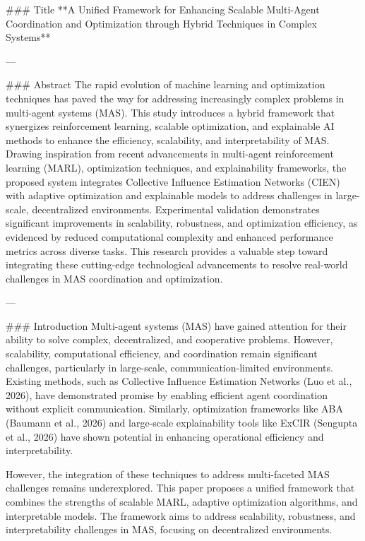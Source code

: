 ### Title  
**A Unified Framework for Enhancing Scalable Multi-Agent Coordination and Optimization through Hybrid Techniques in Complex Systems**

---

### Abstract  
The rapid evolution of machine learning and optimization techniques has paved the way for addressing increasingly complex problems in multi-agent systems (MAS). This study introduces a hybrid framework that synergizes reinforcement learning, scalable optimization, and explainable AI methods to enhance the efficiency, scalability, and interpretability of MAS. Drawing inspiration from recent advancements in multi-agent reinforcement learning (MARL), optimization techniques, and explainability frameworks, the proposed system integrates Collective Influence Estimation Networks (CIEN) with adaptive optimization and explainable models to address challenges in large-scale, decentralized environments. Experimental validation demonstrates significant improvements in scalability, robustness, and optimization efficiency, as evidenced by reduced computational complexity and enhanced performance metrics across diverse tasks. This research provides a valuable step toward integrating these cutting-edge technological advancements to resolve real-world challenges in MAS coordination and optimization.

---

### Introduction  
Multi-agent systems (MAS) have gained attention for their ability to solve complex, decentralized, and cooperative problems. However, scalability, computational efficiency, and coordination remain significant challenges, particularly in large-scale, communication-limited environments. Existing methods, such as Collective Influence Estimation Networks (Luo et al., 2026), have demonstrated promise by enabling efficient agent coordination without explicit communication. Similarly, optimization frameworks like ABA (Baumann et al., 2026) and large-scale explainability tools like ExCIR (Sengupta et al., 2026) have shown potential in enhancing operational efficiency and interpretability.

However, the integration of these techniques to address multi-faceted MAS challenges remains underexplored. This paper proposes a unified framework that combines the strengths of scalable MARL, adaptive optimization algorithms, and interpretable models. The framework aims to address scalability, robustness, and interpretability challenges in MAS, focusing on decentralized environments.

